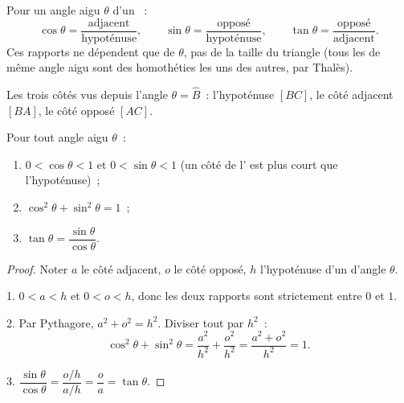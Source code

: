\begin{definition}\label{def:g9:trig:ratios}
Pour un angle aigu $\theta$ d'un ~:
\[
\cos\theta = \frac{\text{adjacent}}{\text{hypoténuse}},
\qquad
\sin\theta = \frac{\text{opposé}}{\text{hypoténuse}},
\qquad
\tan\theta = \frac{\text{opposé}}{\text{adjacent}} .
\]
Ces rapports ne dépendent
que de $\theta$, pas de la taille du triangle (tous les  de même angle aigu sont des homothéties les uns des autres,
par Thalès).
\end{definition}

\begin{omfigure}

{\small Les trois côtés vus depuis l'angle $\theta = \widehat B$~:
l'hypoténuse $[BC]$, le côté adjacent $[BA]$, le côté opposé $[AC]$.}
\end{omfigure}

\begin{proposition}\label{prop:g9:trig:properties}
Pour tout angle aigu $\theta$~:
\begin{enumerate}
  \item $0 < \cos\theta < 1$ et $0 < \sin\theta < 1$ (un côté de l' est plus court que l'hypoténuse)~;
  \item $\cos^2\theta + \sin^2\theta = 1$~;
  \item $\tan\theta = \dfrac{\sin\theta}{\cos\theta}$.
\end{enumerate}
\end{proposition}

\begin{proof}
Noter $a$ le côté adjacent, $o$ le côté opposé, $h$ l'hypoténuse d'un
 d'angle $\theta$.

1. $0 < a < h$ et $0 < o < h$, donc les deux rapports sont strictement
entre $0$ et $1$.

2. Par Pythagore, $a^2 + o^2 = h^2$. Diviser tout par $h^2$~:
\[
\cos^2\theta + \sin^2\theta
= \frac{a^2}{h^2} + \frac{o^2}{h^2}
= \frac{a^2 + o^2}{h^2} = 1 .
\]

3. $\dfrac{\sin\theta}{\cos\theta} = \dfrac{o/h}{a/h} = \dfrac oa
= \tan\theta$.
\end{proof}

